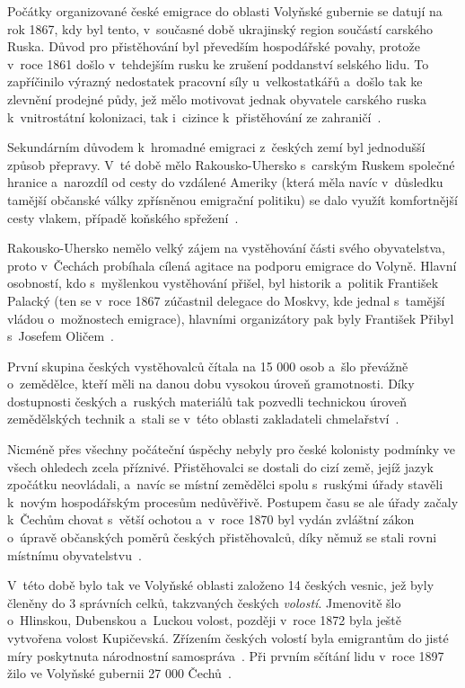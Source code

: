 Počátky organizované české emigrace do oblasti Volyňské gubernie se datují na rok 1867, kdy byl tento, v~současné době ukrajinský region součástí carského Ruska. Důvod pro přistěhování byl převedším hospodářské povahy, protože v~roce 1861 došlo v~tehdejším rusku ke zrušení poddanství selského lidu. To zapříčinilo výrazný nedostatek pracovní síly u~velkostatkářů a~došlo tak ke zlevnění prodejné půdy, jež mělo motivovat jednak obyvatele carského ruska k~vnitrostátní kolonizaci, tak i~cizince k~přistěhování ze zahraničí~\parencite{Auerhan1920}.

Sekundárním důvodem k~hromadné emigraci z~českých zemí byl jednodušší způsob přepravy. V~té době mělo Rakousko-Uhersko s~carským Ruskem společné hranice a~narozdíl od cesty do vzdálené Ameriky (která měla navíc v~důsledku tamější občanské války zpřísněnou emigrační politiku) se dalo využít komfortnější cesty vlakem, případě koňského spřežení~\parencite{Hofman2020}.

Rakousko-Uhersko nemělo velký zájem na vystěhování části svého obyvatelstva, proto v~Čechách probíhala cílená agitace na podporu emigrace do Volyně. Hlavní osobností, kdo s~myšlenkou vystěhování přišel, byl historik a~politik František Palacký (ten se v~roce 1867 zúčastnil delegace do Moskvy, kde jednal s~tamější vládou o~možnostech emigrace), hlavními organizátory pak byly František Přibyl s~Josefem Oličem~\parencite{Hofman2020}.

První skupina českých vystěhovalců čítala na 15 000 osob a~šlo převážně o~zemědělce, kteří měli na danou dobu vysokou úroveň gramotnosti. Díky dostupnosti českých a~ruských materiálů tak pozvedli technickou úroveň zemědělských technik a~stali se v~této oblasti zakladateli chmelařství~\parencite{Vaculik2009b}.

Nicméně přes všechny počáteční úspěchy nebyly pro české kolonisty podmínky ve všech ohledech zcela příznivé. Přistěhovalci se dostali do cizí země, jejíž jazyk zpočátku neovládali, a~navíc se místní zemědělci spolu s~ruskými úřady stavěli k~novým hospodářským procesům nedůvěřivě. Postupem času se ale úřady začaly k~Čechům chovat s~větší ochotou a~v~roce 1870 byl vydán zvláštní zákon o~úpravě občanských poměrů českých přistěhovalců, díky němuž se stali rovni místnímu obyvatelstvu~\parencite{Auerhan1920}.

V~této době bylo tak ve Volyňské oblasti založeno 14 českých vesnic, jež byly členěny do 3 správních celků, takzvaných českých \emph{volostí}. Jmenovitě šlo o~Hlinskou, Dubenskou a~Luckou volost, později v~roce 1872 byla ještě vytvořena volost Kupičevská. Zřízením českých volostí byla emigrantům do jisté míry poskytnuta národnostní samospráva~\parencite{Auerhan1920}. Při prvním sčítání lidu v~roce 1897 žilo ve Volyňské gubernii 27 000 Čechů~\parencite{Vaculik2009a}.

